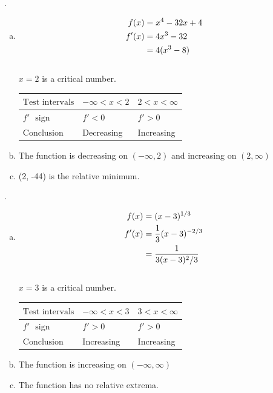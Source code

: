 \documentclass[11pt]{article}
\newcommand*{\vs}{\vspace{1cm}}
\newcommand*{\next}{\noindent}
\newcommand*{\set}{\setcounter{equation}{0}}
\begin{document}
\vs
\next
26.\begin{enumerate}[(a)]
    \item \begin{align}
        \set
        f(x)&=x^4-32x+4\\
        f'(x)&=4x^3-32\\
        &=4(x^3-8)
    \end{align}\\
    $x=2$ is a critical number.
    \begin{flushleft}
        \begin{table}[h]
                \begin{tabular}{|l|l|l|} %
                    \hline
                    $\text{Test intervals}$ & $-\infty<x<2$ & $2<x<\infty$\\ \hline
                    $f'\,\,\,\,\text{sign}$ & $f'<0$ & $f'>0$\\ \hline
                    $\text{Conclusion}$ & Decreasing & Increasing\\
                    \hline
             \end{tabular}
            \end{table}
        \end{flushleft}
        \item The function is decreasing on $(-\infty, 2)$ and increasing on $(2, \infty)$\\
        \item (2, -44) is the relative minimum.
\end{enumerate}

\vs
\next
30.\begin{enumerate}[(a)]
    \item \begin{align}
        \set
        f(x)&=(x-3)^{1/3}\\
        f'(x)&=\frac{1}{3}(x-3)^{-2/3}\\
        &=\frac{1}{3(x-3)^2/3}
    \end{align}\\
    $x=3$ is a critical number.
    \begin{flushleft}
        \begin{table}[h]
                \begin{tabular}{|l|l|l|} %
                    \hline
                    $\text{Test intervals}$ & $-\infty<x<3$ & $3<x<\infty$\\ \hline
                    $f'\,\,\,\,\text{sign}$ & $f'>0$ & $f'>0$\\ \hline
                    $\text{Conclusion}$ & Increasing & Increasing\\
                    \hline
             \end{tabular}
            \end{table}
        \end{flushleft}
        \item The function is increasing on $(-\infty, \infty)$
        \item The function has no relative extrema.
\end{enumerate}
\end{document}
